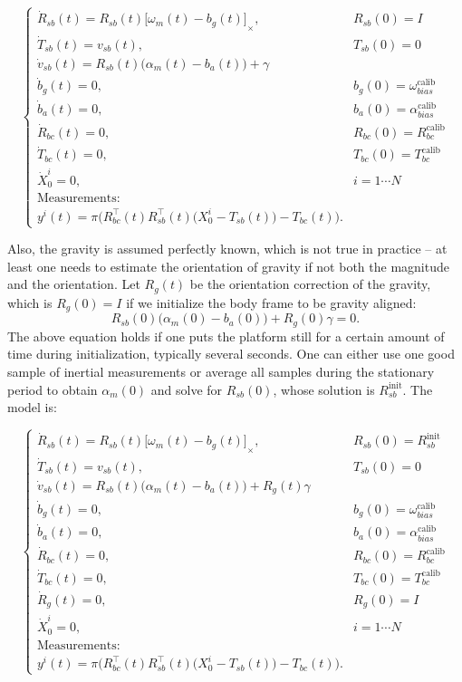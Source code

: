 \documentclass[letter,10pt]{article}
\newcommand{\asym}[1]{{\lbrack #1\rbrack}_\times{}}
\begin{document}
\begin{equation*}
\begin{cases}
\dot{R}_{sb}(t)=R_{sb}(t)\asym{\omega_{m}(t)-b_g(t)}, &R_{sb}(0)=I\\
\dot{T}_{sb}(t)=v_{sb}(t), &T_{sb}(0)=0\\
\dot{v}_{sb}(t)= R_{sb}(t)\big(\alpha_{m}(t) - b_a(t) \big) + \gamma\\
\dot b_g(t)=0, & b_g(0)=\omega_{bias}^{\text{calib}}\\
\dot b_a(t)=0, & b_a(0)=\alpha_{bias}^{\text{calib}}\\
\dot{R}_{bc}(t)=0, &R_{bc}(0)=R_{bc}^{\text{calib}}\\
\dot{T}_{bc}(t)=0, &T_{bc}(0)=T_{bc}^{\text{calib}}\\
\dot{X}_0^i=0, &i=1\cdots N\\
\text{Measurements:}\\
y^i(t) = \pi \Big(R_{bc}^\top(t) R_{sb}^\top(t)\big( X_0^i - T_{sb}(t)\big)-T_{bc}(t) \Big).
\end{cases}
\end{equation*}

Also, the gravity is assumed perfectly known, which is not true in practice -- at least one needs to estimate the orientation of gravity if not both the magnitude and the orientation. Let $R_g(t)$ be the orientation correction of the gravity, which is $R_g(0)=I$ if we initialize the body frame to be gravity aligned:
\begin{equation}
 R_{sb}(0)\big( \alpha_{m}(0)-b_a(0)\big) + R_g(0) \gamma = 0.
\end{equation}
The above equation holds if one puts the platform still for a certain amount of time during initialization, typically several seconds. One can either use one good sample of inertial measurements or average all samples during the stationary period to obtain $\alpha_{m}(0)$ and solve for $R_{sb}(0)$, whose solution is $R_{sb}^{\text{init}}$. The model is:

\begin{equation*}
\begin{cases}
\dot{R}_{sb}(t)=R_{sb}(t)\asym{\omega_{m}(t)-b_g(t)}, &R_{sb}(0)=R_{sb}^{\text{init}}\\
\dot{T}_{sb}(t)=v_{sb}(t), &T_{sb}(0)=0\\
\dot{v}_{sb}(t)= R_{sb}(t)\big( \alpha_{m}(t) - b_a(t) \big) + R_g(t) \gamma\\
\dot b_g(t)=0, & b_g(0)=\omega_{bias}^{\text{calib}}\\
\dot b_a(t)=0, & b_a(0)=\alpha_{bias}^{\text{calib}}\\
\dot{R}_{bc}(t)=0, &R_{bc}(0)=R_{bc}^{\text{calib}}\\
\dot{T}_{bc}(t)=0, &T_{bc}(0)=T_{bc}^{\text{calib}}\\
\dot{R}_g(t)=0, &R_g(0) = I\\
\dot{X}_0^i=0, &i=1\cdots N\\
\text{Measurements:}\\
y^i(t) = \pi \Big(R_{bc}^\top(t) R_{sb}^\top(t)\big( X_0^i - T_{sb}(t)\big)-T_{bc}(t) \Big).
\end{cases}
\end{equation*}
\end{document}

